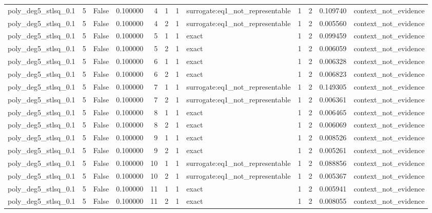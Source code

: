 \begin{tabular}{lrrrrrrlrrrl}
poly\_deg5\_stlsq\_0.1 & 5 & False & 0.100000 & 4 & 1 & 1 & surrogate:eq1\_not\_representable & 1 & 2 & 0.109740 & context\_not\_evidence \\
poly\_deg5\_stlsq\_0.1 & 5 & False & 0.100000 & 4 & 2 & 1 & surrogate:eq1\_not\_representable & 1 & 2 & 0.005560 & context\_not\_evidence \\
poly\_deg5\_stlsq\_0.1 & 5 & False & 0.100000 & 5 & 1 & 1 & exact & 1 & 2 & 0.099459 & context\_not\_evidence \\
poly\_deg5\_stlsq\_0.1 & 5 & False & 0.100000 & 5 & 2 & 1 & exact & 1 & 2 & 0.006059 & context\_not\_evidence \\
poly\_deg5\_stlsq\_0.1 & 5 & False & 0.100000 & 6 & 1 & 1 & exact & 1 & 2 & 0.006328 & context\_not\_evidence \\
poly\_deg5\_stlsq\_0.1 & 5 & False & 0.100000 & 6 & 2 & 1 & exact & 1 & 2 & 0.006823 & context\_not\_evidence \\
poly\_deg5\_stlsq\_0.1 & 5 & False & 0.100000 & 7 & 1 & 1 & surrogate:eq1\_not\_representable & 1 & 2 & 0.149305 & context\_not\_evidence \\
poly\_deg5\_stlsq\_0.1 & 5 & False & 0.100000 & 7 & 2 & 1 & surrogate:eq1\_not\_representable & 1 & 2 & 0.006361 & context\_not\_evidence \\
poly\_deg5\_stlsq\_0.1 & 5 & False & 0.100000 & 8 & 1 & 1 & exact & 1 & 2 & 0.006465 & context\_not\_evidence \\
poly\_deg5\_stlsq\_0.1 & 5 & False & 0.100000 & 8 & 2 & 1 & exact & 1 & 2 & 0.006069 & context\_not\_evidence \\
poly\_deg5\_stlsq\_0.1 & 5 & False & 0.100000 & 9 & 1 & 1 & exact & 1 & 2 & 0.008526 & context\_not\_evidence \\
poly\_deg5\_stlsq\_0.1 & 5 & False & 0.100000 & 9 & 2 & 1 & exact & 1 & 2 & 0.005261 & context\_not\_evidence \\
poly\_deg5\_stlsq\_0.1 & 5 & False & 0.100000 & 10 & 1 & 1 & surrogate:eq1\_not\_representable & 1 & 2 & 0.088856 & context\_not\_evidence \\
poly\_deg5\_stlsq\_0.1 & 5 & False & 0.100000 & 10 & 2 & 1 & surrogate:eq1\_not\_representable & 1 & 2 & 0.005367 & context\_not\_evidence \\
poly\_deg5\_stlsq\_0.1 & 5 & False & 0.100000 & 11 & 1 & 1 & exact & 1 & 2 & 0.005941 & context\_not\_evidence \\
poly\_deg5\_stlsq\_0.1 & 5 & False & 0.100000 & 11 & 2 & 1 & exact & 1 & 2 & 0.008055 & context\_not\_evidence \\

\end{tabular}
